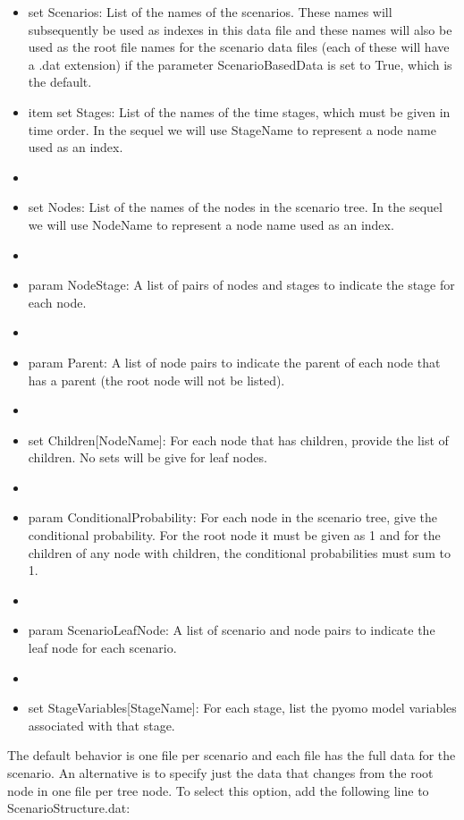 \begin{itemize}
\item set Scenarios: List of the names of the scenarios. These names will subsequently be used as indexes in this data file and these names will
also be used as the root file names for the scenario data files (each of these will have a .dat extension) if the 
parameter ScenarioBasedData is set to True, which is the default. 
\item[]
item set Stages: List of the names of the time stages, which must be given in time order. In the sequel we will use {\sc StageName} to represent a node name used
as an index.
\item[]
\item set Nodes: List of the names of the nodes in the scenario tree. In the sequel we will use {\sc NodeName} to represent a node name used
as an index.
\item[]
\item param NodeStage: A list of pairs of nodes and stages to indicate the stage for each node.
\item[]
\item param Parent: A list of node pairs to indicate the parent of each node that has a parent (the root node will not be listed).
\item[]
\item set Children[{\sc NodeName}]: For each node that has children, provide the list of children. No sets will be give for leaf nodes.
\item[]
\item param ConditionalProbability: For each node in the scenario tree, give the conditional probability. For the root node it must be given as 1 and for
the children of any node with children, the conditional probabilities must sum to 1.
\item[]
\item param ScenarioLeafNode: A list of scenario and node pairs to indicate the leaf node for each scenario.
\item[]
\item set StageVariables[{\sc StageName}]: For each stage, list the pyomo model variables associated with that stage.
\end{itemize}

The default behavior is one file per scenario and each file has the full data for the scenario. An
alternative is to specify just the data that changes from the root node in one file per tree node.
To select this option, add the following line to ScenarioStructure.dat:

